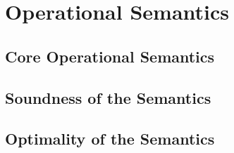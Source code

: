 \section{Operational Semantics}
\subsection{Core Operational Semantics}
%


\subsection{Soundness of the Semantics}
%


\subsection{Optimality of the Semantics}




